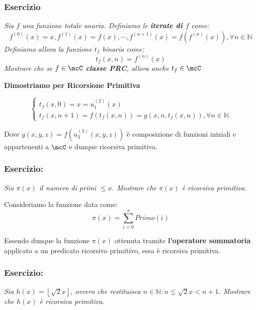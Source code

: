 \subsubsection*{Esercizio} \textit{Sia \(f\) una funzione totale unaria. Definiamo le \textbf{iterate di \(f\)} come:}
\begin{equation}
    f^{(0)}(x)=x, f^{(1)}(x)=f(x),\cdots, f^{(n+1)}(x)=f(f^{(n)}(x)), \forall n \in \mathbb{N}
    \label{Iterate di f Eq}
\end{equation}
\textit{Definiamo allora la funzione \(t_f\) binaria come:}
\begin{equation}
    t_f(x,n)=f^{(n)}(x)
    \label{Funzione iterata n-esima di f Eq}
\end{equation}
\textit{Mostrare che se \(f \in \mcC\) \textbf{classe PRC}, allora anche \(t_f\in\mcC\)}

\textbf{Dimostriamo per Ricorsione Primitiva}

\begin{equation}
    \begin{cases}
        t_f(x,0)=x=u_1^{(2)}(x)\\
        t_f(x,n+1)=f(t_f(x,n))=g(x,n,t_f(x,n)), \forall n \in \mathbb{N}
    \end{cases}
    \label{Funzione iterata n-esima di f Ricorsione Primitiva Eq}
\end{equation}

Dove \(g(x,y,z)=f(u_3^{(3)}(x,y,z))\) è composizione di funzioni iniziali e appartenenti a \(\mcC\) e dunque ricorsiva primitiva.

\subsubsection*{Esercizio:} \textit{Sia \(\pi(x)\) il numero di primi \(\leq x\). Mostrare che \(\pi(x)\) è ricorsiva primitiva.}

Consideriamo la funzione data come:
\begin{equation}
    \pi(x)=\sum_{i=0}^x Primo(i)
    \label{Funzione conta primi}
\end{equation}

Essendo dunque la funzione \(\pi(x)\) ottenuta tramite \textbf{l'operatore sommatoria} applicato a un predicato ricorsivo primitivo, essa è ricorsiva primitiva. %

\subsubsection*{Esercizio:} \textit{Sia \(h(x) =  \left\lfloor\sqrt{2}x\right\rfloor\), ovvero che restituisca \(n\in\mathbb{N}: n\leq\sqrt{2}x<n+1\). Mostrare che \(h(x)\) è ricorsiva primitiva.}

